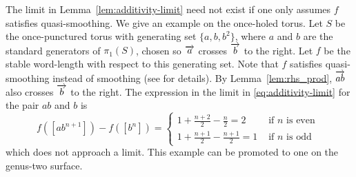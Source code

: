 \begin{remark}
The limit in Lemma~\ref{lem:additivity-limit} need not exist if one
only assumes $f$ satisfies quasi-smoothing.
We give an example on the once-holed torus.
Let $S$ be the once-punctured torus with generating set $\{a,b,b^2\}$,
where $a$ and $b$ are the standard generators of $\pi_1(S)$, chosen so
$\overrightarrow{a}$ crosses $\overrightarrow{b}$ to the right.
Let $f$ be the stable word-length with respect to this generating set.
Note that $f$ satisfies quasi-smoothing instead of smoothing (see \cite[Example~4.10]{MGT21:Smoothings} for details).
By Lemma~\ref{lem:rhs_prod}, $\overrightarrow{ab}$ also crosses $\overrightarrow{b}$ to the
right.
The expression in the limit in \eqref{eq:additivity-limit} for the
pair $ab$ and $b$ is
\begin{equation*}
  f([ab^{n+1}])-f([b^n])=\begin{cases} 1+ \frac{n+2}{2} - \frac{n}{2}=2& \mbox{ if } n \mbox{ is even } \\
    1+ \frac{n+1}{2} - \frac{n+1}{2}=1 & \mbox{ if } n \mbox{ is odd }
  \end{cases}
\end{equation*}
which does not approach a limit.
This example can be promoted to one on the genus-two surface.
\label{rmk:nonconvex}
\end{remark}


